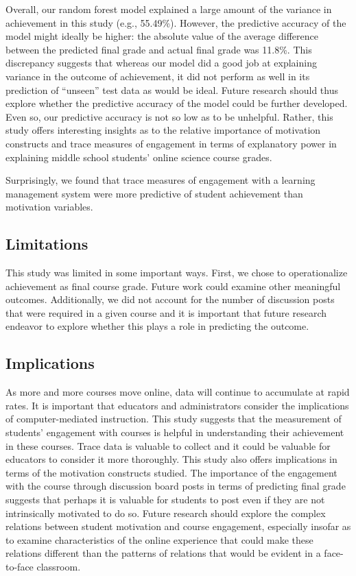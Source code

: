 \documentclass[acmart]{apa6}
\theoremstyle{definition}
\theoremstyle{definition}
\theoremstyle{definition}
\theoremstyle{remark}
\begin{document}
Overall, our random forest model explained a large amount of the
variance in achievement in this study (e.g., 55.49\%). However, the
predictive accuracy of the model might ideally be higher: the absolute
value of the average difference between the predicted final grade and
actual final grade was 11.8\%. This discrepancy suggests that whereas
our model did a good job at explaining variance in the outcome of
achievement, it did not perform as well in its prediction of
\enquote{unseen} test data as would be ideal. Future research should
thus explore whether the predictive accuracy of the model could be
further developed. Even so, our predictive accuracy is not so low as to
be unhelpful. Rather, this study offers interesting insights as to the
relative importance of motivation constructs and trace measures of
engagement in terms of explanatory power in explaining middle school
students' online science course grades.

Surprisingly, we found that trace measures of engagement with a learning
management system were more predictive of student achievement than
motivation variables.

\subsection{Limitations}\label{limitations}

This study was limited in some important ways. First, we chose to
operationalize achievement as final course grade. Future work could
examine other meaningful outcomes. Additionally, we did not account for
the number of discussion posts that were required in a given course and
it is important that future research endeavor to explore whether this
plays a role in predicting the outcome.

\subsection{Implications}\label{implications}

As more and more courses move online, data will continue to accumulate
at rapid rates. It is important that educators and administrators
consider the implications of computer-mediated instruction. This study
suggests that the measurement of students' engagement with courses is
helpful in understanding their achievement in these courses. Trace data
is valuable to collect and it could be valuable for educators to
consider it more thoroughly. This study also offers implications in
terms of the motivation constructs studied. The importance of the
engagement with the course through discussion board posts in terms of
predicting final grade suggests that perhaps it is valuable for students
to post even if they are not intrinsically motivated to do so. Future
research should explore the complex relations between student motivation
and course engagement, especially insofar as to examine characteristics
of the online experience that could make these relations different than
the patterns of relations that would be evident in a face-to-face
classroom.
\end{document}
